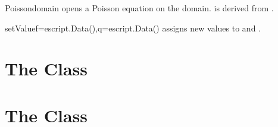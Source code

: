 \begin{classdesc}{Poisson}{domain}
opens a Poisson equation on the \Domain domain. \Poisson is derived from \LinearPDE.
\end{classdesc}
\begin{methoddesc}[Poisson]{setValue}{f=escript.Data(),q=escript.Data()}
assigns new values to  and .
\end{methoddesc}

\section{The \Helmholtz Class}

\section{The \Lame Class}

